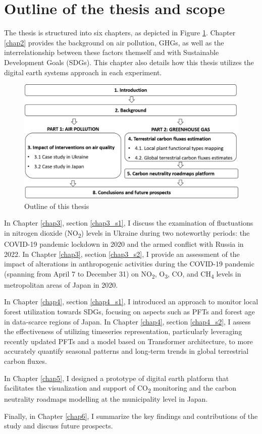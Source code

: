 \section{Outline of the thesis and scope}

The thesis is structured into six chapters, as depicted in Figure \ref{fig:chap1_fig2}. Chapter \ref{chap2} provides the background on air pollution, GHGs, as well as the interrelationship between these factors themself and with Sustainable Development Goals (SDGs). This chapter also details how this thesis utilizes the digital earth systems approach in each experiment. \par
\begin{figure}[tbh!]
    \centering
    \includegraphics[width=\textwidth]{figs/chap1/outline.png}
    \caption{Outline of this thesis}
    \label{fig:chap1_fig2}
\end{figure}

In Chapter \ref{chap3}, section \ref{chap3_s1}, I discuss the examination of fluctuations in nitrogen dioxide (NO\textsubscript{2}) levels in Ukraine during two noteworthy periods: the COVID-19 pandemic lockdown in 2020 and the armed conflict with Russia in 2022. In Chapter \ref{chap3}, section \ref{chap3_s2}, I provide an assessment of the impact of alterations in anthropogenic activities during the COVID-19 pandemic (spanning from April 7 to December 31) on NO\textsubscript{2}, O\textsubscript{3}, CO, and CH\textsubscript{4} levels in metropolitan areas of Japan in 2020. \par

In Chapter \ref{chap4}, section \ref{chap4_s1}, I introduced an approach to monitor local forest utilization towards SDGs, focusing on aspects such as PFTs and forest age in data-scarce regions of Japan. In Chapter \ref{chap4}, section \ref{chap4_s2}, I assess the effectiveness of utilizing timeseries representation, particularly leveraging recently updated PFTs and a model based on Transformer architecture, to more accurately quantify seasonal patterns and long-term trends in global terrestrial carbon fluxes. \par

In Chapter \ref{chap5}, I designed a prototype of digital earth platform that facilitates the visualization and support of CO\textsubscript{2} monitoring and the carbon neutrality roadmaps modelling at the municipality level in Japan. \par

Finally, in Chapter \ref{chap6}, I summarize the key findings and contributions of the study and discuss future prospects.\par
